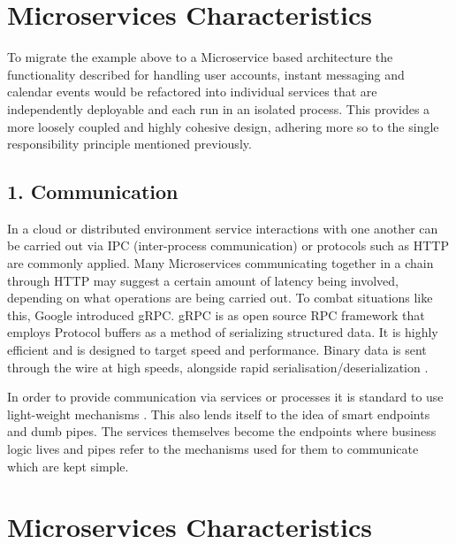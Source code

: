 \documentclass[journal]{IEEEtran}
\begin{document}
\section{Microservices Characteristics}

To migrate the example above to a Microservice based architecture the functionality described for handling user accounts, instant messaging and calendar events would be refactored into individual services that are independently deployable and each run in an isolated process. This provides a more loosely coupled and highly cohesive design, adhering more so to the single responsibility principle mentioned previously.

\subsection*{ 1. Communication }
In a cloud or distributed environment service interactions with one another can be carried out via IPC (inter-process communication) or protocols such as HTTP are commonly applied. Many Microservices communicating together in a chain through HTTP may suggest a certain amount of latency being involved, depending on what operations are being carried out. To combat situations like this, Google introduced gRPC\cite{gRPC}. gRPC is as open source RPC framework that employs Protocol buffers\cite{ProtocolBuffers} as a method of serializing structured data. It is highly efficient and is designed to target speed and performance. Binary data is sent through the wire at high speeds, alongside rapid serialisation/deserialization \cite{gRPCHackernoon}.

In order to provide communication via services or processes it is standard to use light-weight mechanisms \cite{MicroservicesYesterdayTodayTomorrow}. This also lends itself to the idea of smart endpoints and dumb pipes\cite{MicroservicesResourceGuide}. The services themselves become the endpoints where business logic lives and pipes refer to the mechanisms used for them to communicate which are kept simple.

\section{Microservices Characteristics}
\end{document}
